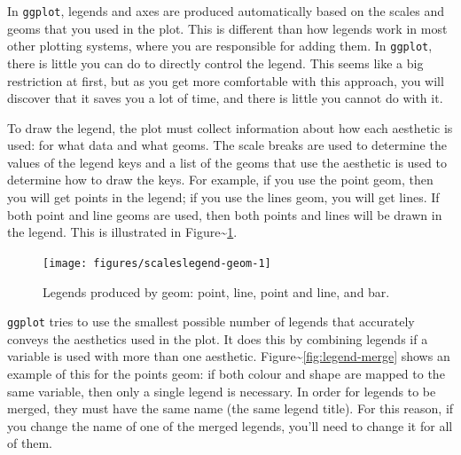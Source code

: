 In \texttt{ggplot}, legends and axes are produced automatically based on
the scales and geoms that you used in the plot. This is different than
how legends work in most other plotting systems, where you are
responsible for adding them. In \texttt{ggplot}, there is little you can
do to directly control the legend.  This seems like a big
restriction at first, but as you get more comfortable with this
approach, you will discover that it saves you a lot of time, and there
is little you cannot do with it.

To draw the legend, the plot must collect information about how each
aesthetic is used: for what data and what geoms. The scale breaks are
used to determine the values of the legend keys and a list of the geoms
that use the aesthetic is used to determine how to draw the keys. For
example, if you use the point geom, then you will get points in the
legend; if you use the lines geom, you will get lines. If both point and
line geoms are used, then both points and lines will be drawn in the
legend. This is illustrated in
Figure\textasciitilde{}\ref{fig:legend-geom}.

\begin{figure}
\texttt{[image: figures/scaleslegend-geom-1]} \caption{Legends produced by geom: point, line, point and line, and bar.\label{fig:legend-geom}}
\end{figure}

\texttt{ggplot} tries to use the smallest possible number of legends
that accurately conveys the aesthetics used in the plot. It does this by
combining legends if a variable is used with more than one aesthetic.
Figure\textasciitilde{}\ref{fig:legend-merge} shows an example of this
for the points geom: if both colour and shape are mapped to the same
variable, then only a single legend is necessary. In order for legends
to be merged, they must have the same name (the same legend title). For
this reason, if you change the name of one of the merged legends, you'll
need to change it for all of them.

\begin{Shaded}
\begin{Highlighting}[]
\StringTok{ }\NormalTok{(diamonds[}\NormalTok{:}\NormalTok{, ], }\StringTok{ }\NormalTok{() }
\StringTok{ }\StringTok{ }\NormalTok{(} 
\StringTok{ }\StringTok{ }\NormalTok{(} 
\StringTok{ }\StringTok{ }\NormalTok{(}  
\NormalTok{(} \NormalTok{)}
\end{Highlighting}
\end{Shaded}

